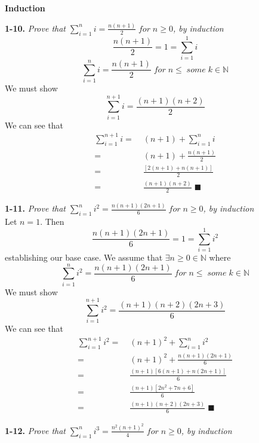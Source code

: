 \textbf{Induction}

\textbf{1-10.} \emph{Prove that $\sum_{i=1}^{n}i=\frac{n(n+1)}{2} \;for\; n \geq 0$, by induction} \\
\textcolor{answer}{
	$$\frac{n(n+1)}{2} = 1 = \sum_{i=1}^{1} i$$
	$$\sum_{i=1}^{n} i = \frac{n(n+1)}{2} \;for\; n \leq \;some\; k \in \mathbb{N}$$
	We must show
	$$\sum_{i=1}^{n+1} i = \frac{(n+1)(n+2)}{2}$$
	We can see that
	\begin{align*}
	\sum_{i=1}^{n+1} i =& \; (n+1) + \sum_{i=1}^{n} i \\
					   =& \; (n+1) + \frac{n(n+1)}{2} \\
					   =& \; \frac{[2(n+1) + n(n+1)]}{2} \\
					   =& \; \frac{(n+1)(n+2)}{2} \;\blacksquare
	\end{align*}
}




\textbf{1-11.} \emph{Prove that $\sum_{i=1}^{n}i^{2}=\frac{n(n+1)(2n+1)}{6} \;for\; n \geq 0$, by induction} \\
Let $n = 1$. Then
$$\frac{n(n+1)(2n+1)}{6} = 1 = \sum_{i=1}^{1} i^{2}$$
establishing our base case. We assume that $\exists n \geq 0 \in  \mathbb{N}$ where
$$\sum_{i=1}^{n} i^{2} = \frac{n(n+1)(2n+1)}{6} \;for\; n \leq \;some\; k \in \mathbb{N}$$
We must show
$$\sum_{i=1}^{n+1}i^{2}=\frac{(n+1)(n+2)(2n+3)}{6}$$
We can see that
\begin{align*}
\sum_{i=1}^{n+1} i^{2} =& \; (n+1)^{2} + \sum_{i=1}^{n} i^2 \\
					   =& \; (n+1)^{2} + \frac{n(n+1)(2n+1)}{6} \\
					   =& \; \frac{(n+1)[6(n+1) + n(2n+1)]}{6} \\
					   =& \; \frac{(n+1)[2n^{2} + 7n + 6]}{6} \\
					   =& \; \frac{(n+1)(n+2)(2n+3)}{6} \;\blacksquare
\end{align*}


\textbf{1-12.} \emph{Prove that $\sum_{i=1}^{n}i^{3}=\frac{n^{2}(n+1)^{2}}{4} \;for\; n \geq 0$, by induction}  \\

